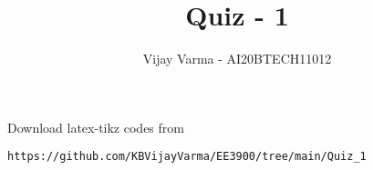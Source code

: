 \documentclass[journal,12pt,twocolumn]{IEEEtran}
\DeclareMathOperator*{\Res}{Res}
\begin{document}
\newcommand{\BEQA}{\begin{eqnarray}}
\newcommand{\EEQA}{\end{eqnarray}}
\newcommand{\define}{\stackrel{\triangle}{=}}

\raggedbottom
\setlength{\parindent}{0pt}
\providecommand{\mbf}{\mathbf}
\providecommand{\pr}[1]{\ensuremath{\Pr\left(#1\right)}}
\providecommand{\qfunc}[1]{\ensuremath{Q\left(#1\right)}}
\providecommand{\sbrak}[1]{\ensuremath{{}\left[#1\right]}}
\providecommand{\lsbrak}[1]{\ensuremath{{}\left[#1\right.}}
\providecommand{\rsbrak}[1]{\ensuremath{{}\left.#1\right]}}
\providecommand{\brak}[1]{\ensuremath{\left(#1\right)}}
\providecommand{\lbrak}[1]{\ensuremath{\left(#1\right.}}
\providecommand{\rbrak}[1]{\ensuremath{\left.#1\right)}}
\providecommand{\cbrak}[1]{\ensuremath{\left\{#1\right\}}}
\providecommand{\lcbrak}[1]{\ensuremath{\left\{#1\right.}}
\providecommand{\rcbrak}[1]{\ensuremath{\left.#1\right\}}}
\theoremstyle{remark}
\newtheorem{rem}{Remark}
\newcommand{\sgn}{\mathop{\mathrm{sgn}}}
\providecommand{\abs}[1]{\vert#1\vert}
\providecommand{\res}[1]{\Res\displaylimits_{#1}} 
\providecommand{\norm}[1]{\lVert#1\rVert}
\providecommand{\mtx}[1]{\mathbf{#1}}
\providecommand{\mean}[1]{E[ #1 ]}
\providecommand{\fourier}{\overset{\mathcal{F}}{ \rightleftharpoons}}
\providecommand{\system}{\overset{\mathcal{H}}{ \longleftrightarrow}}
\newcommand{\solution}{\noindent \textbf{Solution: }}
\newcommand{\cosec}{\,\text{cosec}\,}
\providecommand{\dec}[2]{\ensuremath{\overset{#1}{\underset{#2}{\gtrless}}}}
\newcommand{\myvec}[1]{\ensuremath{\begin{pmatrix}#1\end{pmatrix}}}
\newcommand{\mydet}[1]{\ensuremath{\begin{vmatrix}#1\end{vmatrix}}}
\makeatletter
{}
\makeatother
\let\StandardTheFigure\thefigure
\let\vec\mathbf
\renewcommand{\thefigure}{\theproblem}
\def\putbox#1#2#3{\makebox[0in][l]{\makebox[#1][l]{}\raisebox{\baselineskip}[0in][0in]{\raisebox{#2}[0in][0in]{#3}}}}
     \def\rightbox#1{\makebox[0in][r]{#1}}
     \def\centbox#1{\makebox[0in]{#1}}
     \def\topbox#1{\raisebox{-\baselineskip}[0in][0in]{#1}}
     \def\midbox#1{\raisebox{-0.5\baselineskip}[0in][0in]{#1}}
\vspace{3cm}
\title{Quiz - 1}
\author{Vijay Varma - AI20BTECH11012}
\maketitle
\newpage
\bigskip
\renewcommand{\thefigure}{\theenumi}
\renewcommand{\thetable}{\theenumi}
%
Download latex-tikz codes from 
%
\begin{lstlisting}
https://github.com/KBVijayVarma/EE3900/tree/main/Quiz_1
\end{lstlisting}
%
\end{document}
